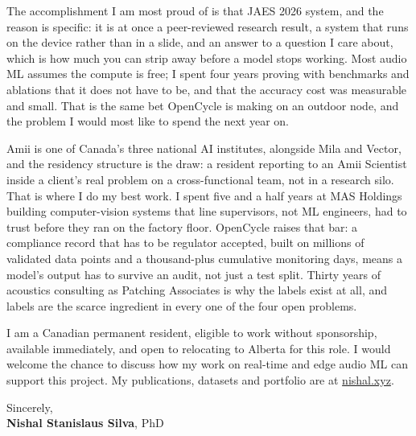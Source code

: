 \documentclass[11pt]{article}
\newcommand{\clName}{Nishal Stanislaus Silva}
\newcommand{\clSite}{https://nishal.xyz}
\begin{document}
The accomplishment I am most proud of is that JAES 2026 system, and the reason is specific: it is at once a peer-reviewed research result, a system that runs on the device rather than in a slide, and an answer to a question I care about, which is how much you can strip away before a model stops working. Most audio ML assumes the compute is free; I spent four years proving with benchmarks and ablations that it does not have to be, and that the accuracy cost was measurable and small. That is the same bet OpenCycle is making on an outdoor node, and the problem I would most like to spend the next year on.

Amii is one of Canada's three national AI institutes, alongside Mila and Vector, and the residency structure is the draw: a resident reporting to an Amii Scientist inside a client's real problem on a cross-functional team, not in a research silo. That is where I do my best work. I spent five and a half years at MAS Holdings building computer-vision systems that line supervisors, not ML engineers, had to trust before they ran on the factory floor. OpenCycle raises that bar: a compliance record that has to be regulator accepted, built on millions of validated data points and a thousand-plus cumulative monitoring days, means a model's output has to survive an audit, not just a test split. Thirty years of acoustics consulting as Patching Associates is why the labels exist at all, and labels are the scarce ingredient in every one of the four open problems.

I am a Canadian permanent resident, eligible to work without sponsorship, available immediately, and open to relocating to Alberta for this role. I would welcome the chance to discuss how my work on real-time and edge audio ML can support this project. My publications, datasets and portfolio are at \href{\clSite}{nishal.xyz}.

\vspace{10pt}
Sincerely,\\[2pt]
\textbf{\clName}, PhD
\end{document}
